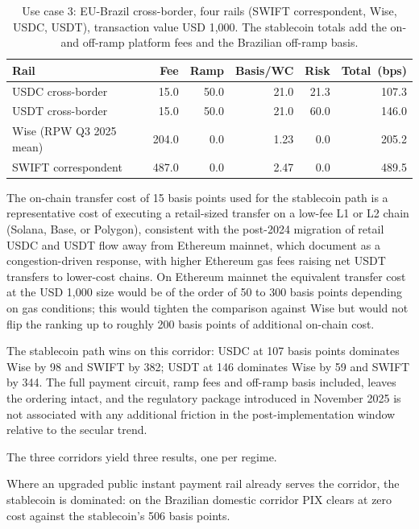 \begin{table}[H]
\centering
\caption{Use case 3: EU-Brazil cross-border, four rails (SWIFT correspondent, Wise, USDC, USDT), transaction value USD 1,000. The stablecoin totals add the on- and off-ramp platform fees and the Brazilian off-ramp basis.}\label{tab:uc3}
\begin{tabular}{lrrrrr}
\toprule
Rail & Fee & Ramp & Basis/WC & Risk & Total~(bps) \\
\midrule
USDC cross-border               & 15.0  & 50.0 & 21.0 & 21.3 & 107.3 \\
USDT cross-border               & 15.0  & 50.0 & 21.0 & 60.0 & 146.0 \\
Wise (RPW Q3 2025 mean)         & 204.0 & 0.0  & 1.23 & 0.0  & 205.2 \\
SWIFT correspondent             & 487.0 & 0.0  & 2.47 & 0.0  & 489.5 \\
\bottomrule
\end{tabular}
\end{table}

The on-chain transfer cost of 15 basis points used for the stablecoin path is a representative cost of executing a retail-sized transfer on a low-fee L1 or L2 chain (Solana, Base, or Polygon), consistent with the post-2024 migration of retail USDC and USDT flow away from Ethereum mainnet, which \citet{klee_etal_2026_fragility} document as a congestion-driven response, with higher Ethereum gas fees raising net USDT transfers to lower-cost chains. On Ethereum mainnet the equivalent transfer cost at the USD 1,000 size would be of the order of 50 to 300 basis points depending on gas conditions; this would tighten the comparison against Wise but would not flip the ranking up to roughly 200 basis points of additional on-chain cost.

The stablecoin path wins on this corridor: USDC at 107 basis points dominates Wise by 98 and SWIFT by 382; USDT at 146 dominates Wise by 59 and SWIFT by 344. The full payment circuit, ramp fees and off-ramp basis included, leaves the ordering intact, and the regulatory package introduced in November 2025 is not associated with any additional friction in the post-implementation window relative to the secular trend.

The three corridors yield three results, one per regime.

\begin{result}\label{res:dominated}
Where an upgraded public instant payment rail already serves the corridor, the stablecoin is dominated: on the Brazilian domestic corridor PIX clears at zero cost against the stablecoin's 506 basis points.
\end{result}

